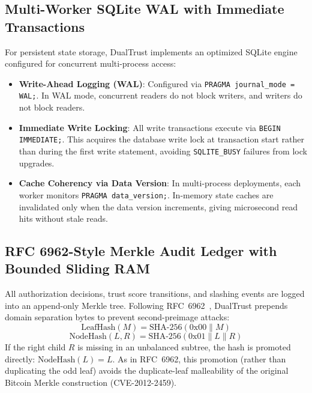 \documentclass[manuscript, screen, review]{jair}
\begin{document}
\subsection{Multi-Worker SQLite WAL with Immediate Transactions}
For persistent state storage, DualTrust implements an optimized SQLite engine configured for concurrent multi-process access:
\begin{itemize}[leftmargin=12pt, topsep=2pt, itemsep=1pt]
\item \textbf{Write-Ahead Logging (WAL)}: Configured via \texttt{PRAGMA journal\_mode = WAL;}. In WAL mode, concurrent readers do not block writers, and writers do not block readers.
\item \textbf{Immediate Write Locking}: All write transactions execute via \texttt{BEGIN IMMEDIATE;}. This acquires the database write lock at transaction start rather than during the first write statement, avoiding \texttt{SQLITE\_BUSY} failures from lock upgrades.
\item \textbf{Cache Coherency via Data Version}: In multi-process deployments, each worker monitors \texttt{PRAGMA data\_version;}. In-memory state caches are invalidated only when the data version increments, giving microsecond read hits without stale reads.
\end{itemize}

\subsection{RFC 6962-Style Merkle Audit Ledger with Bounded Sliding RAM}
All authorization decisions, trust score transitions, and slashing events are logged into an append-only Merkle tree. Following RFC~6962~\cite{laurie2013certificate}, DualTrust prepends domain separation bytes to prevent second-preimage attacks:
\begin{equation}
\text{LeafHash}(M) = \text{SHA-256}(0\text{x}00 \parallel M)
\end{equation}
\begin{equation}
\text{NodeHash}(L, R) = \text{SHA-256}(0\text{x}01 \parallel L \parallel R)
\end{equation}
If the right child $R$ is missing in an unbalanced subtree, the hash is promoted directly: $\text{NodeHash}(L) = L$. As in RFC~6962, this promotion (rather than duplicating the odd leaf) avoids the duplicate-leaf malleability of the original Bitcoin Merkle construction (CVE-2012-2459).
\end{document}
